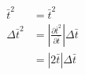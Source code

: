 \begin{align}
  \bar t^2 &= \bar t^{2} \label{eq:t2} \\
  \Delta \bar t^2 &= \left|\frac{\partial \bar t^2}{\partial \bar t}\right| \Delta \bar t \nonumber \\
  &= \left|2 \bar t\right| \Delta \bar t \label{eq:dt2}
\end{align}

